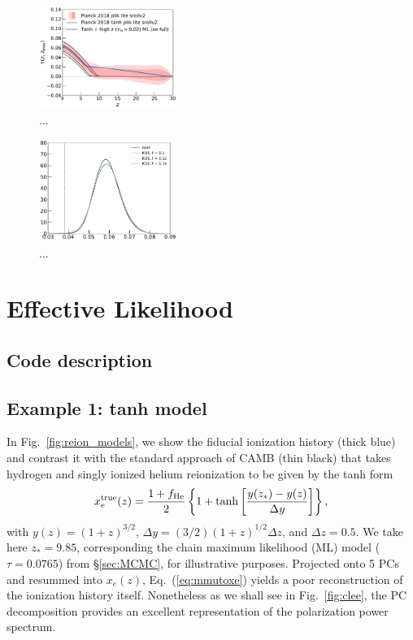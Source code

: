 \documentclass[prd,twocolumn,amsmath,amssymb,floatfix,superscriptaddress,nofootinbib]{revtex4-1}
\begin{document}
\begin{figure}
\includegraphics[width=0.40\textwidth]{plots/plot_tau_gtz.pdf}
\caption{...
}
\label{fig:}
\end{figure}


\begin{figure}
\includegraphics[width=0.40\textwidth]{plots/pl18_pc_zmax30_pliklite_srollv2_1015_tau_posterior_fraccov_1p0_burnin_10000_yes_norm_gaussian0p1_0p12_0p14.pdf}
\caption{...
}
\label{fig:}
\end{figure}




\section{Effective Likelihood}
\label{sec:effective_likelihood}

\subsection{Code description}
\label{sec:code}

\subsection{Example 1: tanh model}
\label{sec:example1}

In Fig.~\ref{fig:reion_models}, we show the fiducial ionization history (thick blue) and contrast it with
the standard approach of CAMB (thin black) that takes hydrogen and singly ionized helium reionization to be given by
the tanh form
 \begin{equation}
x_e^{\rm true}(z) = \frac{1+f_{\rm He}}{2}\left\{  1+ \tanh\left[ \frac{y(z_*)-y(z)}{\Delta y} \right] \right\},
 \label{eqn:tanh}
 \end{equation}
 with $y(z)=(1+z)^{3/2}$, $\Delta y=(3/2)(1+z)^{1/2}\Delta z$, and $\Delta z = 0.5$.  We take here $z_*= 9.85$, corresponding the chain maximum likelihood (ML) model ($\tau = 0.0765$) from \S \ref{sec:MCMC},  for illustrative purposes.   Projected onto 5 PCs and resummed into $x_e(z)$, Eq.~(\ref{eq:mmutoxe}) yields a poor reconstruction of the ionization history itself.
 Nonetheless as we shall see in Fig.~\ref{fig:clee}, the PC decomposition provides an 
 excellent representation of the polarization power spectrum.
 
\end{document}
